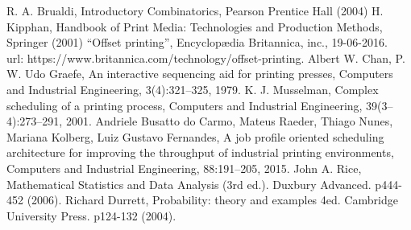 \begin{thebibliography}{}
%
%
R. A. Brualdi, Introductory Combinatorics, Pearson Prentice Hall (2004)
H. Kipphan, Handbook of Print Media: Technologies and Production Methods, Springer (2001)
``Offset printing'', Encyclop{\ae}dia Britannica, inc., 19-06-2016.\\ url: https://www.britannica.com/technology/offset-printing.
Albert W. Chan, P. W. Udo Graefe, An interactive sequencing aid for printing presses, Computers and Industrial Engineering, 3(4):321--325, 1979.
K. J. Musselman, Complex scheduling of a printing process, Computers and Industrial Engineering, 39(3--4):273--291, 2001.
Andriele Busatto do Carmo, Mateus Raeder, Thiago Nunes, Mariana Kolberg, Luiz Gustavo Fernandes, A job profile oriented scheduling architecture for improving the throughput of industrial printing environments, Computers and Industrial Engineering, 88:191--205, 2015.
John A. Rice, Mathematical Statistics and Data Analysis (3rd ed.). Duxbury Advanced. p444-452 (2006).
Richard Durrett, Probability: theory and examples 4ed. Cambridge University Press. p124-132 (2004).
\end{thebibliography}



